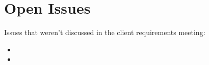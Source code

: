 \documentclass{article}
\begin{document}
	\cleardoublepage
	\section{Open Issues}\label{sec:issues}
	Issues that weren't discussed in the client requirements meeting:
		\begin{itemize}
		  \item 
		  \item 
		\end{itemize}
		
\end{document}
